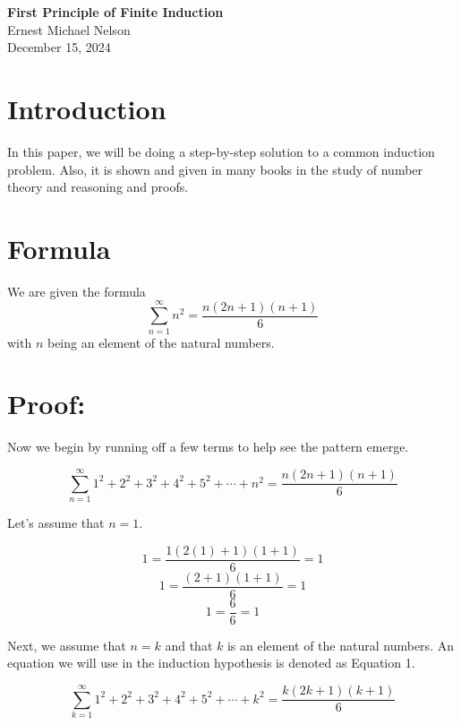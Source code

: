 \documentclass[12pt]{article}
\begin{document}
\begin{center}
    \Large \textbf{First Principle of Finite Induction} \\
    \vspace{0.5cm}
    \large Ernest Michael Nelson \\
    \vspace{0.5cm}
    \normalsize December 15, 2024
\end{center}

\vspace{1.5cm}

\section{Introduction}

In this paper, we will be doing a step-by-step solution to a common induction problem. Also, it is shown and given in many books in the study of number theory and reasoning and proofs.

\section{Formula}

We are given the formula
\[
\sum_{n=1}^\infty n^2 = \frac{n(2n+1)(n+1)}{6}
\]
with \( n \) being an element of the natural numbers.

\section{Proof:}

Now we begin by running off a few terms to help see the pattern emerge.

\[
\sum_{n=1}^\infty 1^2 + 2^2 + 3^2 + 4^2 + 5^2 + \cdots + n^2 = \frac{n(2n+1)(n+1)}{6}
\]

Let's assume that \( n=1 \).

\[
1 = \frac{1(2(1)+1)(1+1)}{6} = 1
\]
\[
1 = \frac{(2+1)(1+1)}{6} = 1
\]
\[
1 = \frac{6}{6} = 1
\]

Next, we assume that \( n = k \) and that \( k \) is an element of the natural numbers. An equation we will use in the induction hypothesis is denoted as Equation 1.

\[
\sum_{k=1}^\infty 1^2 + 2^2 + 3^2 + 4^2 + 5^2 + \cdots + k^2 = \frac{k(2k+1)(k+1)}{6}
\]
\end{document}
